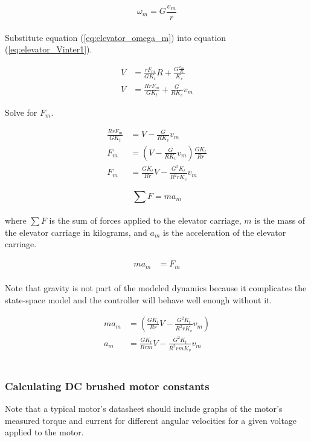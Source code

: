 \begin{equation}
  \omega_m = G \frac{v_m}{r} \label{eq:elevator_omega_m}
\end{equation}
\\
Substitute equation (\ref{eq:elevator_omega_m}) into equation
(\ref{eq:elevator_Vinter1}).

\begin{align*}
  V &= \frac{rF_m}{GK_t} R + \frac{G \frac{v_m}{R}}{K_v} \\
  V &= \frac{RrF_m}{GK_t} + \frac{G}{RK_v} v_m
\end{align*}

Solve for $F_m$.

\begin{align}
  \frac{RrF_m}{GK_t} &= V - \frac{G}{RK_v} v_m \nonumber \\
  F_m &= \left(V - \frac{G}{RK_v} v_m\right) \frac{GK_t}{Rr} \nonumber \\
  F_m &= \frac{GK_t}{Rr} V - \frac{G^2K_t}{R^2 rK_v} v_m \label{eq:elevator_F_m}
\end{align}

\begin{equation}
  \sum F = ma_m \label{eq:elevator_F_ma}
\end{equation}
\\
where $\sum F$ is the sum of forces applied to the elevator carriage, $m$ is
the mass of the elevator carriage in kilograms, and $a_m$ is the acceleration of
the elevator carriage.

\begin{align}
  ma_m &= F_m \nonumber
\end{align}
\\
Note that gravity is not part of the modeled dynamics because it complicates the
state-space model and the controller will behave well enough without it.

\begin{align}
  ma_m &= \left(\frac{GK_t}{Rr} V - \frac{G^2K_t}{R^2 rK_v} v_m\right)
    \nonumber \\
  a_m &= \frac{GK_t}{Rrm} V - \frac{G^2K_t}{R^2 rmK_v} v_m
    \label{eq:elevator_accel}
\end{align}
\\
\subsubsection{Calculating DC brushed motor constants}

Note that a typical motor's datasheet should include graphs of the motor's
measured torque and current for different angular velocities for a given voltage
applied to the motor.

